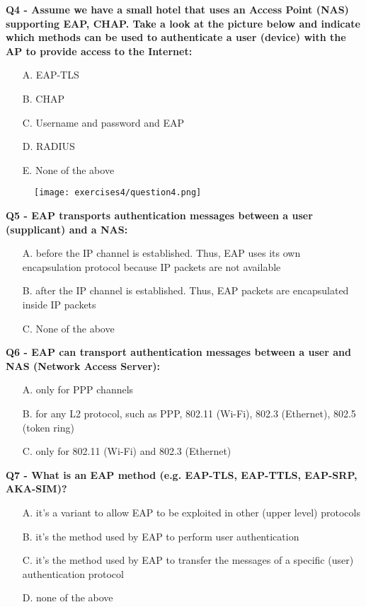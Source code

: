 \textbf{Q4 - Assume we have a small hotel that uses an Access Point (NAS) supporting EAP, CHAP. Take a look at the picture below and indicate which methods can be used to authenticate a user (device) with the AP to provide access to the Internet:}
\begin{itemize}
    \item[A.] EAP-TLS
    \item[B.] CHAP
    \item[C.] Username and password and EAP
    \item[D.] RADIUS
    \item[E.] None of the above
\end{itemize}
\begin{figure}[h]
    \centering
    \texttt{[image: exercises4/question4.png]}
\end{figure}

\textbf{Q5 - EAP transports authentication messages between a user (supplicant) and a NAS:}
\begin{itemize}
    \item[A.] before the IP channel is established. Thus, EAP uses its own encapsulation protocol because IP packets are not available
    \item[B.] after the IP channel is established. Thus, EAP packets are encapsulated inside IP packets
    \item[C.] None of the above
\end{itemize}

\textbf{Q6 - EAP can transport authentication messages between a user and NAS (Network Access Server):}
\begin{itemize}
    \item[A.] only for PPP channels
    \item[B.] for any L2 protocol, such as PPP, 802.11 (Wi-Fi), 802.3 (Ethernet), 802.5 (token ring)
    \item[C.] only for 802.11 (Wi-Fi) and 802.3 (Ethernet)
\end{itemize}

\textbf{Q7 - What is an EAP method (e.g. EAP-TLS, EAP-TTLS, EAP-SRP, AKA-SIM)?}
\begin{itemize}
    \item[A.] it's a variant to allow EAP to be exploited in other (upper level) protocols
    \item[B.] it's the method used by EAP to perform user authentication
    \item[C.] it's the method used by EAP to transfer the messages of a specific (user) authentication protocol
    \item[D.] none of the above
\end{itemize}

